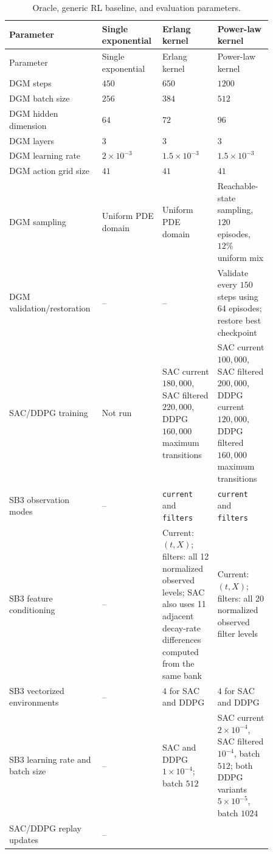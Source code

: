 \documentclass[11pt]{article}
\newcommand{\code}[1]{\texttt{#1}}
\newcommand{\NA}{--}
\begin{document}
\begin{longtable}{p{0.26\linewidth}p{0.20\linewidth}p{0.20\linewidth}p{0.20\linewidth}}
\caption{Oracle, generic RL baseline, and evaluation parameters.}
\label{tab:benchmark_parameters}\\
\toprule
Parameter & Single exponential & Erlang kernel & Power-law kernel \\
\midrule
\endfirsthead
\toprule
Parameter & Single exponential & Erlang kernel & Power-law kernel \\
\midrule
\endhead
\bottomrule
\endfoot
DGM steps & \(450\) & \(650\) & \(1200\) \\
DGM batch size & \(256\) & \(384\) & \(512\) \\
DGM hidden dimension & \(64\) & \(72\) & \(96\) \\
DGM layers & \(3\) & \(3\) & \(3\) \\
DGM learning rate & \(2\times10^{-3}\) & \(1.5\times10^{-3}\) & \(1.5\times10^{-3}\) \\
DGM action grid size & \(41\) & \(41\) & \(41\) \\
DGM sampling &
Uniform PDE domain &
Uniform PDE domain &
Reachable-state sampling, \(120\) episodes, \(12\%\) uniform mix \\
DGM validation/restoration &
\NA &
\NA &
Validate every \(150\) steps using \(64\) episodes; restore best checkpoint \\
SAC/DDPG training &
Not run &
SAC current \(180{,}000\), SAC filtered \(220{,}000\), DDPG \(160{,}000\) maximum transitions &
SAC current \(100{,}000\), SAC filtered \(200{,}000\), DDPG current \(120{,}000\), DDPG filtered \(160{,}000\) maximum transitions \\
SB3 observation modes &
\NA &
\code{current} and \code{filters} &
\code{current} and \code{filters} \\
SB3 feature conditioning &
\NA &
Current: \((t,X)\); filters: all 12 normalized observed levels; SAC also uses 11 adjacent decay-rate differences computed from the same bank &
Current: \((t,X)\); filters: all 20 normalized observed filter levels \\
SB3 vectorized environments &
\NA &
\(4\) for SAC and DDPG &
\(4\) for SAC and DDPG \\
SB3 learning rate and batch size &
\NA &
SAC and DDPG \(1\times10^{-4}\); batch \(512\) &
SAC current \(2\times10^{-4}\), SAC filtered \(10^{-4}\), batch \(512\); both DDPG variants \(5\times10^{-5}\), batch \(1024\) \\
SAC/DDPG replay updates &
\NA &

\end{longtable}
\end{document}
